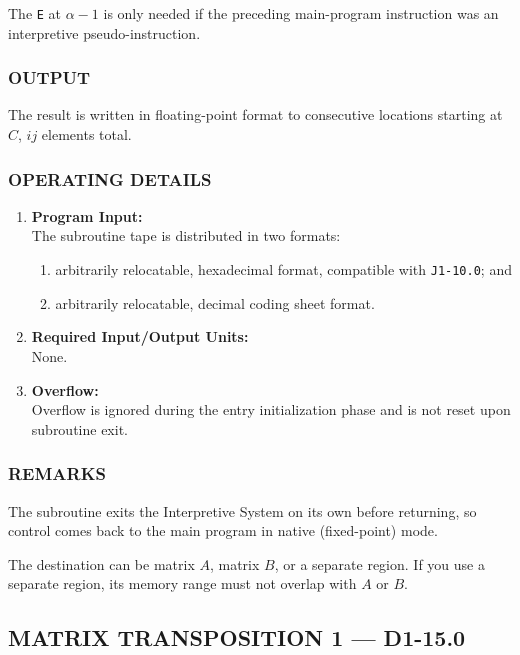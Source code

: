 \medskip
\noindent
The \texttt{E} at $\alpha-1$ is only needed if the preceding main-program instruction was an interpretive pseudo-instruction.

\subsubsection*{OUTPUT}
The result is written in floating-point format to consecutive locations starting at $C$, $ij$ elements total.

\subsubsection*{OPERATING DETAILS}

\begin{enumerate}[leftmargin=1.5em, itemsep=6pt]
    \item \textbf{Program Input:} \\
    The subroutine tape is distributed in two formats:
    \begin{enumerate}[label=\alph*), itemsep=2pt, topsep=2pt]
        \item arbitrarily relocatable, hexadecimal format, compatible with \texttt{J1-10.0}; and
        \item arbitrarily relocatable, decimal coding sheet format.
    \end{enumerate}
    
    \item \textbf{Required Input/Output Units:} \\
    None.
    
    \item \textbf{Overflow:} \\
    Overflow is ignored during the entry initialization phase and is not reset upon subroutine exit.
\end{enumerate}

\subsubsection*{REMARKS}
The subroutine exits the Interpretive System on its own before returning, so control comes back to the main program in native (fixed-point) mode.

The destination can be matrix $A$, matrix $B$, or a separate region. If you use a separate region, its memory range must not overlap with $A$ or $B$.
\newpage

\subsection*{MATRIX TRANSPOSITION 1 --- D1-15.0}
\label{subsec:matrix_transposition_1}

